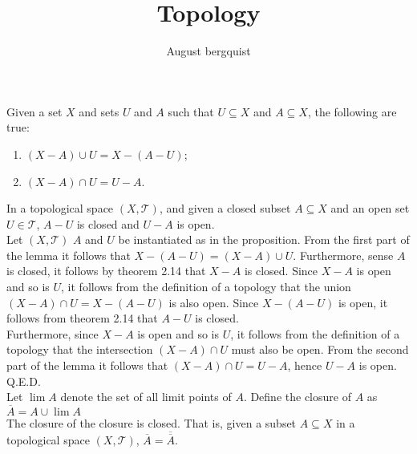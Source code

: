 \documentclass{article}
\title{Topology}
\author{August bergquist}
\theoremstyle{definition}
\newcommand{\topT}{\mathcal{T}}
\begin{document}
 Given a set $X$ and sets $U$ and $A$ such that $U\subseteq X$ and $A\subseteq X$, the following are true:
\begin{enumerate}
    \item $(X-A)\cup U = X-(A-U)$;
    \item $(X-A)\cap U = U -A$.
\end{enumerate}


 In a topological space $(X,\topT)$, and given a closed subset $A\subseteq X$ and an open set $U\in \topT$, $A-U$ is closed and $U-A$ is open. \\

 Let $(X,\topT)$ $A$ and $U$ be instantiated as in the proposition. From the first part of the lemma it follows that $X-(A-U) = (X-A)\cup U$. Furthermore, sense $A$ is closed, it follows by theorem 2.14 that $X-A$ is closed. Since $X-A$ is open and so is $U$, it follows from the definition of a topology that the union $(X-A)\cap U = X-(A-U)$ is also open. Since $X-(A-U)$ is open, it follows from theorem 2.14 that $A-U$ is closed.\\

Furthermore, since $X-A$ is open and so is $U$, it follows from the definition of a topology that the intersection $(X-A)\cap U$ must also be open. From the second part of the lemma it follows that $(X-A)\cap U = U-A$, hence $U-A$ is open. Q.E.D.\\


 Let $\lim A$ denote the set of all limit points of $A$. Define the closure of $A$ as $\overline{A} = A\cup \lim A$\\

 The closure of the closure is closed. That is, given a subset $A\subseteq X$ in a topological space $(X,\topT)$, $\overline{A} = \overline{\overline{A}}$.\\
\end{document}

